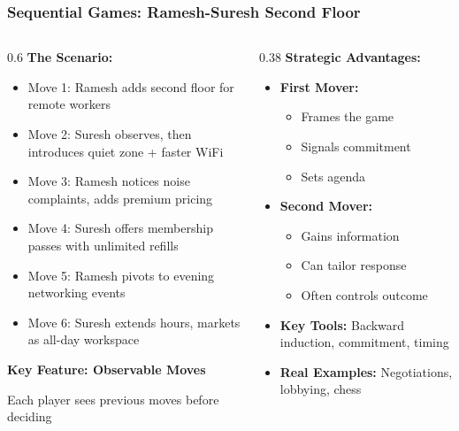 \begin{frame}[fragile]\frametitle{Sequential Games: Ramesh-Suresh Second Floor}
\begin{columns}
    \begin{column}[T]{0.6\linewidth}
      \textbf{The Scenario:}
      \begin{itemize}
        \item Move 1: Ramesh adds second floor for remote workers
        \item Move 2: Suresh observes, then introduces quiet zone + faster WiFi
        \item Move 3: Ramesh notices noise complaints, adds premium pricing
        \item Move 4: Suresh offers membership passes with unlimited refills
        \item Move 5: Ramesh pivots to evening networking events
        \item Move 6: Suresh extends hours, markets as all-day workspace
      \end{itemize}
      
      \vspace{4pt}
      \textbf{Key Feature: Observable Moves}
      \begin{center}
      \small Each player sees previous moves before deciding
      \end{center}
    \end{column}
    \begin{column}[T]{0.38\linewidth}
      \textbf{Strategic Advantages:}
      \begin{itemize}
        \item \textbf{First Mover:} 
        \begin{itemize}
          \item Frames the game
          \item Signals commitment
          \item Sets agenda
        \end{itemize}
        \item \textbf{Second Mover:}
        \begin{itemize}
          \item Gains information
          \item Can tailor response
          \item Often controls outcome
        \end{itemize}
        \item \textbf{Key Tools:} Backward induction, commitment, timing
        \item \textbf{Real Examples:} Negotiations, lobbying, chess
      \end{itemize}
    \end{column}
  \end{columns}
\end{frame}


